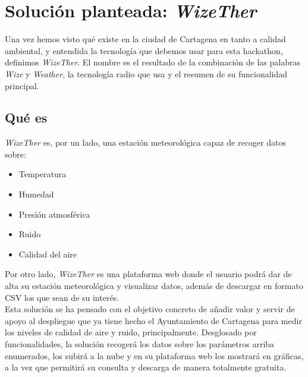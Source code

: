\documentclass[12pt]{article}
\begin{document}
\pagebreak

\section{Solución planteada: \textit{WizeTher}}

Una vez hemos visto qué existe en la ciudad de Cartagena en tanto a calidad ambiental, y entendida la tecnología que debemos usar para esta hackathon, definimos \textit{WizeTher}. El nombre es el resultado de la combinación de las palabras \textit{Wize} y \textit{Weather}, la tecnología radio que usa y el resumen de su funcionalidad principal. 

\subsection{Qué es} %

\textit{WizeTher} es, por un lado, una estación meteorológica capaz de recoger datos sobre:

\begin{itemize}
	\item Temperatura
	\item Humedad
	\item Presión atmosférica
	\item Ruido
	\item Calidad del aire \\
\end{itemize}

\noindent Por otro lado, \textit{WizeTher} es una plataforma web donde el usuario podrá dar de alta su estación meteorológica y visualizar datos, además de descargar en formato CSV los que sean de su interés. \\


\noindent Esta solución se ha pensado con el objetivo concreto de  añadir valor y servir de apoyo al despliegue que ya tiene hecho el Ayuntamiento de Cartagena para medir los niveles de calidad de aire y ruido, principalmente. Desglosado por funcionalidades, la solución recogerá los datos sobre los parámetros arriba enumerados, los subirá a la nube y en su plataforma web los mostrará en gráficas, a la vez que permitirá su consulta y descarga de manera totalmente gratuita. \\
\end{document}
